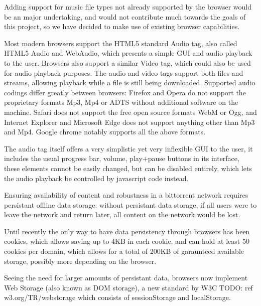 Adding support for music file types not already supported by the browser 
would be an major undertaking, 
and would not contribute much towards the goals of this project, 
so we have decided to make use of existing browser capabilities.
\newline

Most modern browsers support the HTML5 standard Audio tag,
also called HTML5 Audio and WebAudio,
which presents a simple GUI and audio playback to the user.
Browsers also support a similar Video tag, 
which could also be used for audio playback purposes.
The audio and video tags support both files and streams, 
allowing playback while a file is still being downloaded.
\newline
Supported audio codings differ greatly between browsers:
Firefox and Opera do not support the proprietary formats Mp3, Mp4 or ADTS
without additional software on the machine.
Safari does not support the free open source formats WebM or Ogg,
and Internet Explorer and Microsoft Edge does not support anything other than Mp3 and Mp4.
Google chrome notably supports all the above formats.
\newline

The audio tag itself offers a very simplistic yet very inflexible GUI to the user, 
it includes the usual progress bar, volume, play+pause buttons in its interface, 
these elements cannot be easily changed, but can be disabled entirely, 
which lets the audio playback be controlled by javascript code instead.
\newline





Ensuring availability of content and robustness in a bittorrent network requires persistant offline data storage:
without persistant data storage, if all users were to leave the network and return later, all content on the 
network would be lost.
\newline

Until recently the only way to have data persistency through browsers has been cookies, 
which allows saving up to 4KB in each cookie, and can hold at least 50 cookies per domain, 
which allows for a total of 200KB of garaunteed available storage, possibly more depending on the browser.
\newline

Seeing the need for larger amounts of persistant data, browsers now implement Web Storage 
(also known as DOM storage),
a new standard by W3C
TODO: ref w3.org/TR/webstorage 
which consists of sessionStorage and localStorage.

